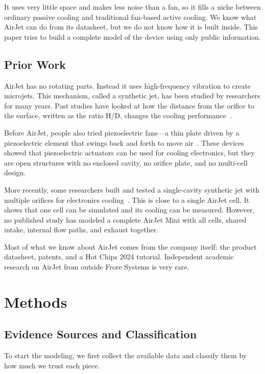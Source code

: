 \documentclass[11pt]{article}
\begin{document}
It uses very little space and makes less noise than a fan, so it fills
a niche between ordinary passive cooling and traditional fan-based
active cooling. We know what AirJet can do from its datasheet, but we
do not know how it is built inside. This paper tries to build a
complete model of the device using only public information.

\subsection{Prior Work}

AirJet has no rotating parts. Instead it uses high-frequency vibration
to create microjets. This mechanism, called a synthetic jet, has been
studied by researchers for many years. Past studies have looked at how
the distance from the orifice to the surface, written as the ratio H/D,
changes the cooling performance~\cite{krishan2019synthetic}.

Before AirJet, people also tried piezoelectric fans---a thin plate
driven by a piezoelectric element that swings back and forth to move
air~\cite{yoo2000piezoelectric}. These devices showed that piezoelectric
actuators can be used for cooling electronics, but they are open
structures with no enclosed cavity, no orifice plate, and no multi-cell
design.

More recently, some researchers built and tested a single-cavity
synthetic jet with multiple orifices for electronics cooling~\cite{singh2022experimental}.
This is close to a single AirJet cell. It shows that one cell can be
simulated and its cooling can be measured. However, no published study
has modeled a complete AirJet Mini with all cells, shared intake,
internal flow paths, and exhaust together.

Most of what we know about AirJet comes from the company itself: the
product datasheet, patents, and a Hot Chips 2024 tutorial. Independent
academic research on AirJet from outside Frore Systems is very rare.

\section{Methods}

\subsection{Evidence Sources and Classification}

To start the modeling, we first collect the available data and classify
them by how much we trust each piece.
\end{document}
